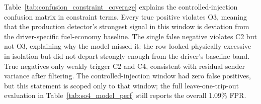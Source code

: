 \begin{table}[!htbp]
\centering
\caption{Constraint Coverage of the Confusion Matrix on the Controlled-Injection Window}
\label{tab:confusion_constraint_coverage}
\scriptsize
\setlength{\tabcolsep}{2pt}
\renewcommand{\arraystretch}{1.15}
\normalsize
\end{table}

Table~\ref{tab:confusion_constraint_coverage} explains the controlled-injection confusion matrix in constraint terms. Every true positive violates O3, meaning that the production detector's strongest signal in this window is deviation from the driver-specific fuel-economy baseline. The single false negative violates C2 but not O3, explaining why the model missed it: the row looked physically excessive in isolation but did not depart strongly enough from the driver's baseline band. True negatives only weakly trigger C2 and C4, consistent with residual sender variance after filtering. The controlled-injection window had zero false positives, but this statement is scoped only to that window; the full leave-one-trip-out evaluation in Table~\ref{tab:so4_model_perf} still reports the overall 1.09\% FPR.


